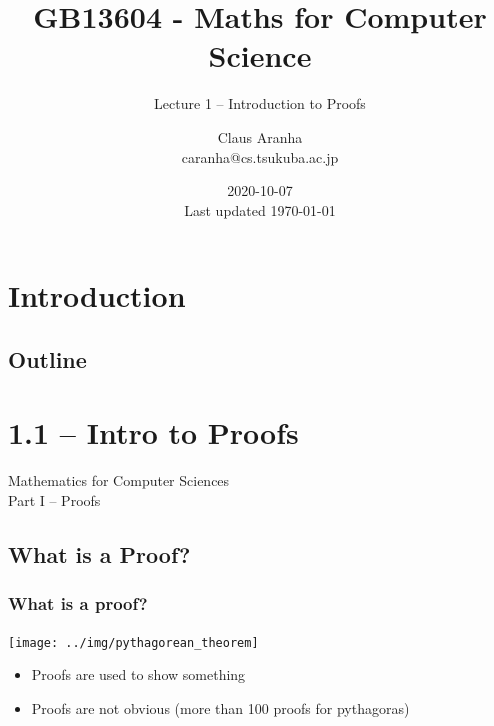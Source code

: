 \documentclass{beamer}
\title[GB13604]{GB13604 - Maths for Computer Science}
\subtitle[]{Lecture 1 -- Introduction to Proofs}
\author[Claus Aranha]{Claus Aranha\\{\footnotesize caranha@cs.tsukuba.ac.jp}}
\institute[COINS]{College of Information Science}
\date[2020-10-07]{2020-10-07\\{\tiny Last updated \today}}
\begin{document}
\section{Introduction}
\subsection{Outline}

\begin{frame}
  \maketitle
\end{frame}

\section{1.1 -- Intro to Proofs}

\begin{frame}
  \begin{center}
    Mathematics for Computer Sciences\\
    Part I -- Proofs
  \end{center}
\end{frame}

\subsection{What is a Proof?}

\begin{frame}
  \frametitle{What is a proof?}

  \begin{center}
    \texttt{[image: ../img/pythagorean\_theorem]}
  \end{center}
  \begin{itemize}
  \item Proofs are used to show  something
  \item Proofs are not obvious (more than 100 proofs for pythagoras)
  \end{itemize}
\end{frame}
\end{document}
